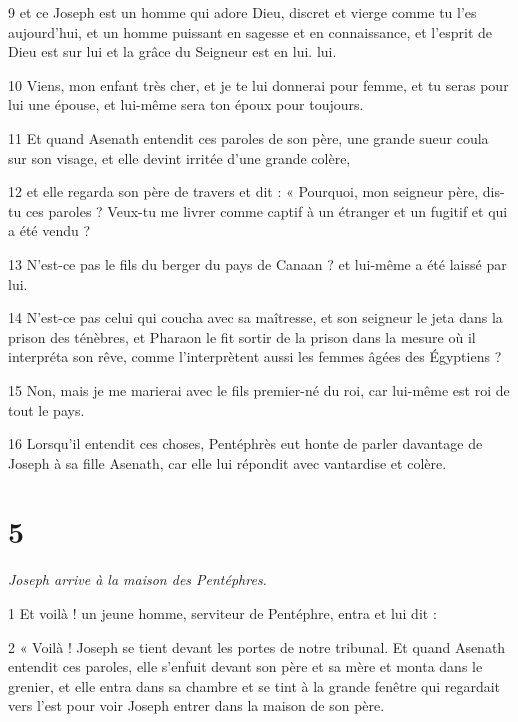 \par 9 et ce Joseph est un homme qui adore Dieu, discret et vierge comme tu l'es aujourd'hui, et un homme puissant en sagesse et en connaissance, et l'esprit de Dieu est sur lui et la grâce du Seigneur est en lui. lui.

\par 10 Viens, mon enfant très cher, et je te lui donnerai pour femme, et tu seras pour lui une épouse, et lui-même sera ton époux pour toujours.

\par 11 Et quand Asenath entendit ces paroles de son père, une grande sueur coula sur son visage, et elle devint irritée d'une grande colère,

\par 12 et elle regarda son père de travers et dit : « Pourquoi, mon seigneur père, dis-tu ces paroles ? Veux-tu me livrer comme captif à un étranger et un fugitif et qui a été vendu ?

\par 13 N'est-ce pas le fils du berger du pays de Canaan ? et lui-même a été laissé par lui.

\par 14 N'est-ce pas celui qui coucha avec sa maîtresse, et son seigneur le jeta dans la prison des ténèbres, et Pharaon le fit sortir de la prison dans la mesure où il interpréta son rêve, comme l'interprètent aussi les femmes âgées des Égyptiens ?

\par 15 Non, mais je me marierai avec le fils premier-né du roi, car lui-même est roi de tout le pays.

\par 16 Lorsqu'il entendit ces choses, Pentéphrès eut honte de parler davantage de Joseph à sa fille Asenath, car elle lui répondit avec vantardise et colère.

\chapter{5}

\textit{Joseph arrive à la maison des Pentéphres.}

\par 1 Et voilà ! un jeune homme, serviteur de Pentéphre, entra et lui dit :

\par 2 « Voilà ! Joseph se tient devant les portes de notre tribunal. Et quand Asenath entendit ces paroles, elle s'enfuit devant son père et sa mère et monta dans le grenier, et elle entra dans sa chambre et se tint à la grande fenêtre qui regardait vers l'est pour voir Joseph entrer dans la maison de son père.

